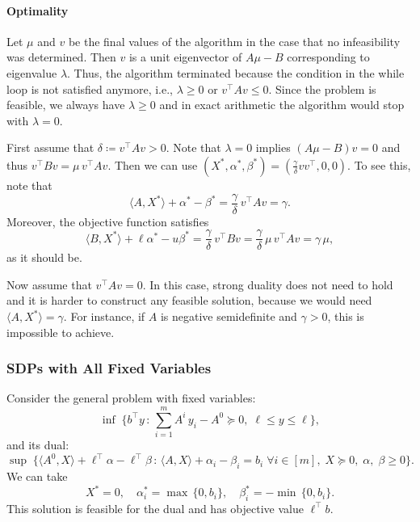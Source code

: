 \documentclass[10pt, a4paper]{article}
\newcommand{\suchthat}{\,:\,}
\newcommand{\define}{\coloneqq}
\newcommand{\skal}[2]{\langle{#1},{#2}\rangle}
\newcommand{\T}{^{\top}}
\begin{document}
\paragraph{Optimality}

Let $\mu$ and $v$ be the final values of the algorithm in the case that no
infeasibility was determined. Then $v$ is a unit eigenvector of $A \mu - B$
corresponding to eigenvalue $\lambda$. Thus, the algorithm terminated
because the condition in the while loop is not satisfied anymore, i.e.,
$\lambda \geq 0$ or $v\T A v \leq 0$. Since the problem is feasible, we
always have $\lambda \geq 0$ and in exact arithmetic the algorithm would
stop with $\lambda = 0$.

First assume that $\delta \define v\T A v > 0$. Note that $\lambda = 0$
implies $(A \mu - B)v = 0$ and thus $v\T B v = \mu\, v\T A v$. Then we can
use $(X^*, \alpha^*, \beta^*) = (\frac{\gamma}{\delta} v v\T, 0, 0)$.  To
see this, note that
\[
\skal{A}{X^*} + \alpha^* - \beta^* = \frac{\gamma}{\delta}\, v\T A v = \gamma.
\]
Moreover, the objective function satisfies
\[
\skal{B}{X^*} + \ell \alpha^* - u \beta^* = \frac{\gamma}{\delta}\, v\T B v
= \frac{\gamma}{\delta}\, \mu\, v\T A v = \gamma\, \mu,
\]
as it should be.

Now assume that $v\T A v = 0$. In this case, strong duality does not need
to hold and it is harder to construct any feasible solution, because we
would need $\skal{A}{X^*} = \gamma$. For instance, if $A$ is negative
semidefinite and $\gamma > 0$, this is impossible to achieve.




\subsubsection{SDPs with All Fixed Variables}

Consider the general problem with fixed variables:
\[
  \inf\; \{ b\T y \suchthat \sum_{i=1}^m A^i\, y_i - A^0 \succeq 0,\; \ell \leq y \leq \ell\},
\]
and its dual:
\[
  \sup\; \{\skal{A^0}{X} + \ell\T \alpha - \ell\T \beta \suchthat \skal{A}{X} +
  \alpha_i - \beta_i = b_i\; \forall i \in [m],\; X \succeq 0,\; \alpha,\; \beta \geq 0\}.
\]
We can take
\[
X^* = 0,\quad
\alpha^*_i = \max\,\{0, b_i\}, \quad
\beta^*_i = -\min\,\{0, b_i\}.
\]
This solution is feasible for the dual and has objective value $\ell\T b$.

\begin{small}
   
   
\end{small}
\end{document}
